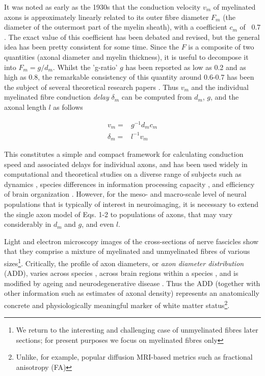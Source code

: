 It was noted as early as the 1930s that the conduction velocity $v_m$ of myelinated axons is approximately linearly related to its outer fibre diameter $F_m$ (the diameter of the outermost part of the myelin sheath), with a coefficient $c_m$ of ~0.7  \cite{hursh1939the,rushton1951a,waxman1972relative}. The exact value of this coefficient has been debated and revised, but the general idea has been pretty consistent for some time. Since the $F$ is a composite of two quantities (axonal diameter and myelin thickness), it is useful to decompose it into $F_m = g/d_m$. Whilst the 'g-ratio' $g$ has been reported as low as 0.2 and as high as 0.8, the remarkable consistency of this quantity around 0.6-0.7 has been the subject of several theoretical research papers 
\cite{rushton1951a,chomiak2009what,paus2009could,caminiti2009evolution,ritchie1982on}. Thus $v_m$ and the individual myelinated fibre conduction \textit{delay} $\delta_m$ can be computed from $d_m$, $g$, and the axonal length $l$ as follows

\begin{eqnarray}
v_m      =& g^{-1} d_m c_m \\
\delta_m =& l^{-1} v_m
\end{eqnarray}




This constitutes a simple and compact framework for calculating conduction speed and associated delays for individual axons, and has been used widely in computational and theoretical studies on a diverse range of subjects such as dynamics \cite{bojak2010axonal}, species differences in information processing capacity \cite{caminiti2009evolution}, and efficiency of brain organization \cite{chomiak2009what}. However, for the meso- and macro-scale level of neural populations that is typically of interest in neuroimaging, it is necessary to extend the single axon model of Eqs. 1-2 to  populations of axons, that may vary considerably in $d_m$ and $g$, and even $l$. 

Light and electron microscopy images of the cross-sections of nerve fascicles show that they comprise a mixture of myelinated and unmyelinated fibres of various sizes\footnote{We return to the interesting and challenging case of unmyelinated fibres later sections; for present purposes we focus on myelinated fibres only}. Critically, the profile of axon diameters, or \textit{axon diameter distribution} (ADD), varies across species \cite{caminiti2013diameter}, across brain regions within a species \cite{aboitiz1992fiber,innocenti2010fiber}, and is modified by ageing and neurodegenerative disease \cite{peters2009the}. Thus the ADD (together with other information such as estimates of axonal density) represents an anatomically concrete and physiologically meaningful marker of white matter status\footnote{Unlike, for example, popular diffusion MRI-based metrics such as fractional anisotropy (FA)}. 

